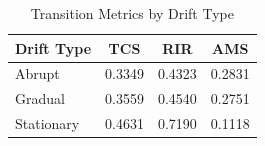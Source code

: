 \begin{table}[htbp]
\centering
\caption{Transition Metrics by Drift Type}
\label{tab:transition_metrics}
\begin{tabular}{lccc}
\toprule
Drift Type & TCS & RIR & AMS \\
\midrule
Abrupt & 0.3349 & 0.4323 & 0.2831 \\
Gradual & 0.3559 & 0.4540 & 0.2751 \\
Stationary & 0.4631 & 0.7190 & 0.1118 \\
\bottomrule
\end{tabular}
\end{table}